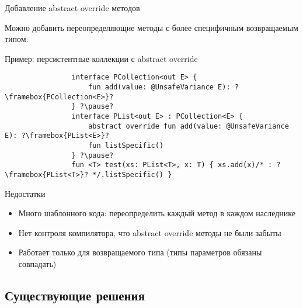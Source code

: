 \documentclass[aspectratio=169,usenames,dvipsnames]{beamer}
\begin{document}
    \begin{frame}[fragile]{Добавление abstract override методов}

        Можно добавить переопределяющие методы с более специфичным возвращаемым типом.

        \begin{block}{Пример: персистентные коллекции с abstract override}
            \begin{verbatim}
                interface PCollection<out E> {
                    fun add(value: @UnsafeVariance E): ?\framebox{PCollection<E>}?
                } ?\pause?
                interface PList<out E> : PCollection<E> {
                    abstract override fun add(value: @UnsafeVariance E): ?\framebox{PList<E>}?
                    fun listSpecific()
                } ?\pause?
                fun <T> test(xs: PList<T>, x: T) { xs.add(x)/* : ?\framebox{PList<T>}? */.listSpecific() }
            \end{verbatim}
        \end{block}

        \pause

        \begin{block}{Недостатки}
            \begin{itemize}
                \item Много шаблонного кода: переопределить каждый метод в каждом наследнике
                \item Нет контроля компилятора, что abstract override методы не были забыты
                \item Работает только для возвращаемого типа (типы параметров обязаны совпадать)
            \end{itemize}
        \end{block}
    \end{frame}


    \subsection{Существующие решения}
\end{document}
